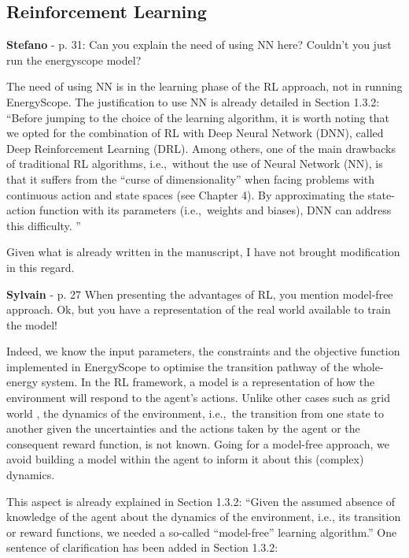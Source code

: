 \documentclass[12pt,a4paper]{article}
\def\ie{i.e.,\ }
\begin{document}
\subsection{Reinforcement Learning}
\label{methodo_RL}

\begin{mdframed}[style=comment] %
{\color{orange} \textbf{Stefano}} - p. 31: Can you explain the need of using NN here? Couldn’t you just run the energyscope model?
\end{mdframed}

\noindent The need of using NN is in the learning phase of the RL approach, not in running EnergyScope. The justification to use NN is already detailed in Section 1.3.2: ``Before jumping to the choice of the learning algorithm, it is worth noting that we opted for the combination of RL with Deep Neural Network (DNN), called Deep Reinforcement Learning (DRL). Among others, one of the main drawbacks of traditional RL algorithms, \ie without the use of Neural Network (NN),  is that it suffers from the ``curse of dimensionality'' when facing problems with continuous action and state spaces (see Chapter 4). By approximating the state-action function with its parameters (\ie weights and biases), DNN can address this difficulty. ''

Given what is already written in the manuscript, I have not brought modification in this regard.

\begin{mdframed}[style=comment] %
{\color{purple} \textbf{Sylvain}} - p. 27 When presenting the advantages of RL, you mention model-free approach. Ok, but you have a representation of the real world available to train the model!
\end{mdframed}

\noindent Indeed, we know the input parameters, the constraints and the objective function implemented in EnergyScope to optimise the transition pathway of the whole-energy system. In the RL framework, a model is a representation of how the environment will respond to the agent's actions. Unlike other cases such as grid world \cite{grid_world}, the dynamics of the environment, \ie the transition from one state to another given the uncertainties and the actions taken by the agent or the consequent reward function, is not known.  Going for a model-free approach, we avoid building a model within the agent to inform it about this (complex) dynamics.

This aspect is already explained in Section 1.3.2: ``Given the assumed absence of knowledge of the agent about the dynamics of the environment, i.e., its transition or reward functions, we needed a so-called ``model-free'' learning algorithm.'' One sentence of clarification has been added {\color{blue}in Section 1.3.2}:
\end{document}

